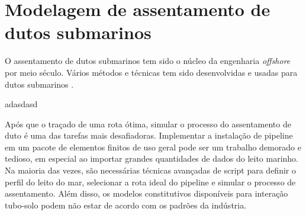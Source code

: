 \chapter{Modelagem de assentamento de dutos submarinos}
\label{chap:assentamento}

O assentamento de dutos submarinos tem sido o núcleo da engenharia \textit{offshore} por meio século. Vários métodos e técnicas tem sido desenvolvidas e usadas para dutos submarinos \cite[]{Ivic2016}.


adasdasd


Após que o traçado de uma rota ótima, simular o processo do assentamento de duto é uma das tarefas mais desafiadoras. Implementar a instalação de pipeline em um pacote de elementos finitos de uso geral pode ser um trabalho demorado e tedioso, em especial ao importar grandes quantidades de dados do leito marinho. Na maioria das vezes, são necessárias técnicas avançadas de script para definir o perfil do leito do mar, selecionar a rota ideal do pipeline e simular o processo de assentamento. Além disso, os modelos constitutivos disponíveis para interação tubo-solo podem não estar de acordo com os padrões da indústria.